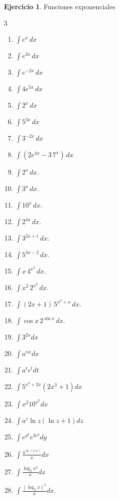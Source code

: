 \documentclass[12pt]{article}
\theoremstyle{definition}
\newtheorem{Ejer}[teorema]{Ejercicio}
\theoremstyle{remark}
\begin{document}
\begin{Ejer}{Funciones exponenciales}

\begin{multicols}{3}
\begin{enumerate}[resume=integrales]
\item $\displaystyle \int e^x\,dx$
\item $\displaystyle \int e^{3x}\,dx$
\item $\displaystyle \int e^{-2x}\,dx$
\item $\displaystyle \int 4e^{5x}\,dx$
\item $\displaystyle \int 2^x\,dx$
\item $\displaystyle \int 5^{3x}\,dx$
\item $\displaystyle \int 3^{-2x}\,dx$
\item $\displaystyle \int(2e^{4x}-3\,7^x)\,dx$
    \item $\int 2^x\,dx.$
    \item $\int 3^x\,dx.$
    \item $\int 10^x\,dx.$
    \item $\int 2^{4x}\,dx.$
    \item$\int 3^{2x+1}\,dx.$
    \item $\int 5^{3x-2}\,dx.$
    \item $\int x\,4^{x^2}\,dx.$
    \item $\int x^2\,2^{x^3}\,dx.$
    \item $\int (2x+1)\,5^{x^2+x}\,dx.$
    \item $\int \cos x\,2^{\sin x}\,dx.$
\item $\int3^{2x}dx$ 
\item $\int a^{nx}dx$ 
\item $\int a^t e^t dt$ 
\item $\int5^{x^4+2x}(2x^3+1)dx$
\item $\int x^2 10^{x^3}dx$ 
\item $\int a^z\ln z(\ln z+1)dz$ 
\item $\int e^{y^2}e^{3e^y}dy$ 
\item $\int\frac{4^{\ln(1/x)}}x dx$
\item $\int\frac{\log_2x^2}{x}dx$
\item $\int\frac{(\log_3x)^2}{x}dx$.
\end{enumerate}
\end{multicols}
\end{Ejer}
\end{document}
